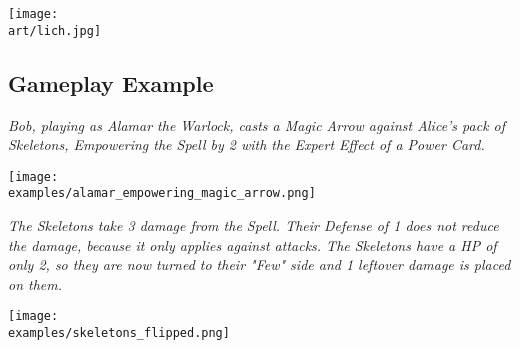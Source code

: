 \begin{multicols}{2}

\texttt{[image: \\art/lich.jpg]}

\subsection*{Gameplay Example}

\textit{Bob, playing as Alamar the Warlock, casts a Magic Arrow against Alice's pack of Skeletons, Empowering  the Spell by 2 with the Expert  Effect  of a Power Card.}

\medskip

\texttt{[image: \\examples/alamar\_empowering\_magic\_arrow.png]}

\medskip

\textit{The Skeletons take 3 damage  from the Spell.
  Their Defense  of 1 does not reduce the damage, because it only applies against attacks.
  The Skeletons have a HP  of only 2, so they are now turned to their "Few" side and 1 leftover damage  is placed on them.
}

\bigskip

\texttt{[image: \\examples/skeletons\_flipped.png]}

\end{multicols}
